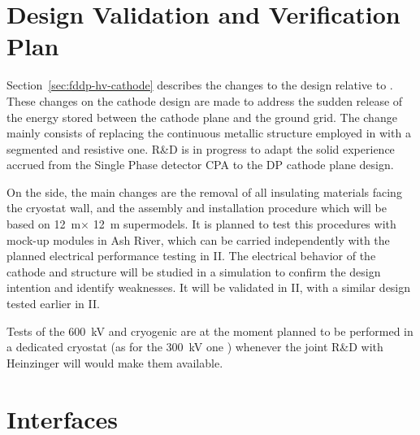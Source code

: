 



\section{Design Validation and Verification Plan}
\label{sec:fddp-hv-verification}

Section~\ref{sec:fddp-hv-cathode}  describes the changes to the design relative to %
. These changes on the cathode design are made to address the sudden release of the energy stored between the cathode plane and the ground grid. The change mainly consists of replacing the continuous metallic structure employed in  with a segmented and resistive one.  
R\&D is in progress to adapt the solid experience accrued from the Single Phase detector CPA to the DP cathode plane design.

On the  side, the main changes are the removal of all insulating materials facing the cryostat wall, and the assembly and installation procedure which will be based on \SI{12}{\m}$\times$ \SI{12}{\m} supermodels. 
It is planned to test this procedures with mock-up modules in Ash River, which can be carried independently with the planned electrical performance testing in  II.   
The electrical behavior of the cathode and  structure will be studied in a  simulation to  confirm the design intention and identify weaknesses. It will be validated in  II, with a similar  design tested earlier in  II. 

Tests of the \SI{600}{kV}  %
and cryogenic \fdth are at the moment planned to be performed in a dedicated cryostat (as for the \SI{300}{kV} one ) whenever the joint R\&D with Heinzinger will would make them available.


\section{Interfaces }
\label{sec:fddp-hv-transport-interfaces}

